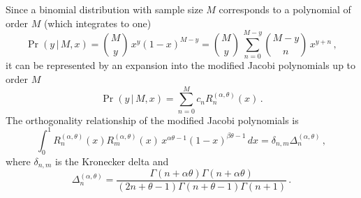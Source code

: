 \documentclass[preprint]{elsarticle}
\newcommand\given{{\,|\,}}
\begin{document}
Since a binomial distribution with sample size $M$ corresponds to a polynomial of order $M$ (which integrates to one) 
\begin{equation}
\Pr(y\given M,x)=\binom{M}{y}\,x^{y}(1-x)^{M-y}
=\binom{M}{y}\,\sum_{n=0}^{M-y} \binom{M-y}{n}\,x^{y+n}\,,
\end{equation}
it can be represented by an expansion into the modified Jacobi polynomials up to order $M$
\begin{equation}
\Pr(y\given M,x)=\sum_{n=0}^M c_n R_n^{(\alpha,\theta)}(x)\,.
\end{equation}
The orthogonality relationship of the modified Jacobi polynomials is
\begin{equation}
    \int_0^1 R_n^{(\alpha,\theta)}(x) R_m^{(\alpha,\theta)}(x)\, x^{\alpha\theta-1}(1-x)^{\beta\theta-1}\,dx=\delta_{n,m} \Delta_n^{(\alpha,\theta)}\,,
\end{equation}
where $\delta_{n,m}$ is the Kronecker delta and 
\begin{equation}
    \Delta_n^{(\alpha,\theta)}=\frac{\Gamma(n+\alpha\theta)\Gamma(n+\alpha\theta)}{(2n+\theta-1)\Gamma(n+\theta-1)\Gamma(n+1)}\,.
\end{equation}
\end{document}
